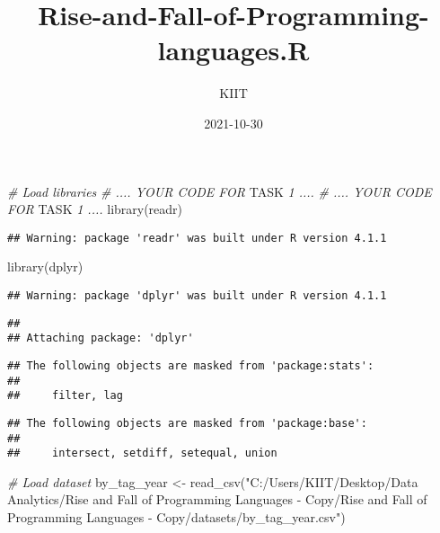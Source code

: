 \documentclass[
]{article}
\title{Rise-and-Fall-of-Programming-languages.R}
\author{KIIT}
\date{2021-10-30}
\newenvironment{Shaded}{\begin{snugshade}}{\end{snugshade}}
\newcommand{\AlertTok}[1]{\textcolor[rgb]{0.94,0.16,0.16}{#1}}
\newcommand{\CommentTok}[1]{\textcolor[rgb]{0.56,0.35,0.01}{\textit{#1}}}
\newcommand{\FunctionTok}[1]{\textcolor[rgb]{0.00,0.00,0.00}{#1}}
\newcommand{\NormalTok}[1]{#1}
\newcommand{\OtherTok}[1]{\textcolor[rgb]{0.56,0.35,0.01}{#1}}
\newcommand{\StringTok}[1]{\textcolor[rgb]{0.31,0.60,0.02}{#1}}
\begin{document}
\maketitle

\begin{Shaded}
\begin{Highlighting}[]
\CommentTok{\# Load libraries}
\CommentTok{\# .... YOUR CODE FOR }\AlertTok{TASK}\CommentTok{ 1 ....}
\CommentTok{\# .... YOUR CODE FOR }\AlertTok{TASK}\CommentTok{ 1 ....}
\FunctionTok{library}\NormalTok{(readr)}
\end{Highlighting}
\end{Shaded}

\begin{verbatim}
## Warning: package 'readr' was built under R version 4.1.1
\end{verbatim}

\begin{Shaded}
\begin{Highlighting}[]
\FunctionTok{library}\NormalTok{(dplyr)}
\end{Highlighting}
\end{Shaded}

\begin{verbatim}
## Warning: package 'dplyr' was built under R version 4.1.1
\end{verbatim}

\begin{verbatim}
## 
## Attaching package: 'dplyr'
\end{verbatim}

\begin{verbatim}
## The following objects are masked from 'package:stats':
## 
##     filter, lag
\end{verbatim}

\begin{verbatim}
## The following objects are masked from 'package:base':
## 
##     intersect, setdiff, setequal, union
\end{verbatim}

\begin{Shaded}
\begin{Highlighting}[]
\CommentTok{\# Load dataset}
\NormalTok{by\_tag\_year }\OtherTok{\textless{}{-}} \FunctionTok{read\_csv}\NormalTok{(}\StringTok{"C:/Users/KIIT/Desktop/Data Analytics/Rise and Fall of Programming Languages {-} Copy/Rise and Fall of Programming Languages {-} Copy/datasets/by\_tag\_year.csv"}\NormalTok{)}
\end{Highlighting}
\end{Shaded}
\end{document}
